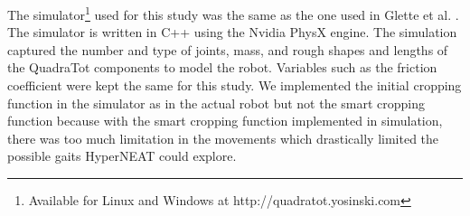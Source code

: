 The simulator\footnote{Available for Linux and Windows at http://quadratot.yosinski.com} used for this study was the same as the one used in Glette et al. \cite{glette}. The simulator is written in C++ using the Nvidia PhysX engine. The simulation captured the number and type of joints, mass, and rough shapes and lengths of the QuadraTot components to model the robot. Variables such as the friction coefficient were kept the same for this study. 
We implemented the initial cropping function in the simulator as in the actual robot but not the smart cropping function because with the smart cropping function implemented in simulation, there was too much limitation in the movements which drastically limited the possible gaits HyperNEAT could explore. %
%
%

